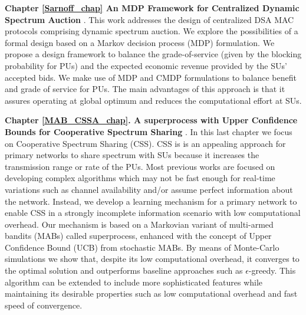 \textbf{Chapter \ref{Sarnoff_chap} An MDP Framework for Centralized Dynamic Spectrum Auction} \cite{ref:Alcaraz2012}.
This work addresses the design of centralized DSA MAC protocols comprising dynamic spectrum auction. We explore the possibilities of a formal design based on a Markov decision process (MDP) formulation. We propose a design framework to balance the grade-of-service (given by the blocking probability for PUs) and the expected economic revenue provided by the SUs' accepted bids. We make use of MDP and CMDP formulations to balance benefit and grade of service for PUs. 
The main advantages of this approach is that it assures operating at global optimum and reduces the computational effort at SUs.

\textbf{Chapter \ref{MAB_CSSA_chap}. A superprocess with Upper Confidence Bounds for Cooperative Spectrum Sharing} \cite{ref:Mario2015_MAB_CSSA_1,ref:Mario2015_MAB_CSSA_2}. In this last chapter we focus on Cooperative Spectrum Sharing (CSS). CSS is is an appealing approach for primary networks to share spectrum with SUs because it increases the transmission range or rate of the PUs. Most previous works are focused on developing complex algorithms which may not be fast enough for real-time variations such as channel availability and/or assume perfect information about the network. Instead, we develop a learning mechanism for a primary network to enable CSS in a strongly incomplete information scenario with low computational overhead. Our mechanism is based on a Markovian variant of multi-armed bandits (MABs) called superprocess, enhanced with the concept of Upper Confidence Bound (UCB) from stochastic MABs. By means of Monte-Carlo simulations we show that, despite its low computational overhead, it converges to the optimal solution and outperforms baseline approaches such as $\epsilon$-greedy. This algorithm can be extended to include more sophisticated features while maintaining its desirable properties such as low computational overhead and fast speed of convergence. 

